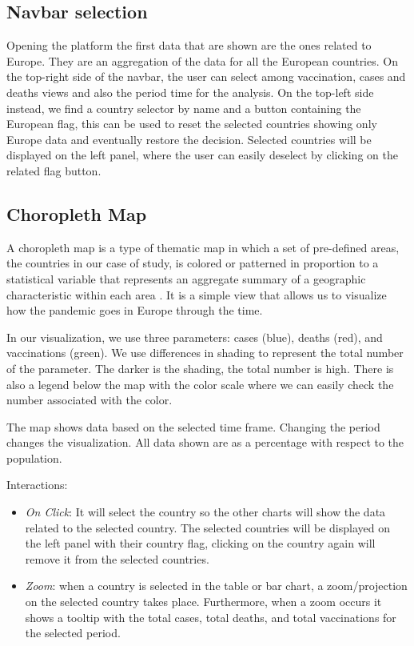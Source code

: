 \documentclass[10pt,conference]{IEEEtran}
\begin{document}
\subsection{Navbar selection}
Opening the platform the first data that are shown are the ones related to Europe. They are an aggregation of the data for all the European countries.
On the top-right side of the navbar, the user can select among vaccination, cases and deaths views and also the period time for the analysis. On the top-left side instead, we find a country selector by name and a button containing the European flag, this can be used to reset the selected countries showing only Europe data and eventually restore the decision. Selected countries will be displayed on the left panel, where the user can easily deselect by clicking on the related flag button.

\subsection{Choropleth Map}
A choropleth map is a type of thematic map in which a set of pre-defined areas, the countries in our case of study, is colored or patterned in proportion to a statistical variable that represents an aggregate summary of a geographic characteristic within each area \cite{map}. It is a simple view that allows us to visualize how the pandemic goes in Europe through the time. 

In our visualization, we use three parameters: cases (blue), deaths (red), and vaccinations (green). We use differences in shading to represent the total number of the parameter. The darker is the shading, the total number is high. There is also a legend below the map with the color scale where we can easily check the number associated with the color.

The map shows data based on the selected time frame. Changing the period changes the visualization. All data shown are as a percentage with respect to the population.

Interactions:
\begin{itemize}
 \item {\em On Click}: It will select the country so the other charts will show the data related to the selected country. The selected countries will be displayed on the left panel with their country flag, clicking on the country again will remove it from the selected countries.
 \item {\em Zoom}: when a country is selected in the table or bar chart, a zoom/projection on the selected country takes place. Furthermore, when a zoom occurs it shows a tooltip with the total cases, total deaths, and total vaccinations for the selected period.
\end{itemize}
\end{document}
